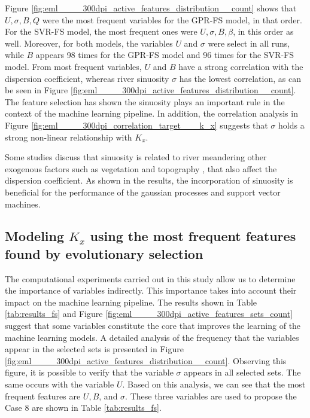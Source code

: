 \documentclass[a4paper,12pt, english]{article}
\begin{document}
Figure \ref{fig:eml____300dpi_active_features_distribution__count} shows that $ U, \sigma, B, Q $ were the most frequent variables for the GPR-FS model, in that order. For the SVR-FS model, the most frequent ones were $ U, \sigma, B, \beta $, in this order as well.
Moreover, for both models, the variables $ U $ and $ \sigma $ were select in all runs, while  $ B $  appears 98 times for the GPR-FS model and 96 times for the SVR-FS model.
From most frequent variables, $ U $ and $ B $ have a strong correlation with the dispersion coefficient, whereas river sinuosity $ \sigma $ has the lowest correlation, as can be seen in Figure \ref{fig:eml____300dpi_active_features_distribution__count}. 
% 
The feature selection has shown the sinuosity plays an important rule in the context of the machine learning pipeline. 
In addition, the correlation analysis in Figure 
\ref{fig:eml____300dpi_correlation_target___k_x}
suggests that $\sigma$ holds a strong non-linear relationship with $K_x$. 


Some studies discuss that sinuosity is related to river meandering \cite{deng2002longitudinal} other  exogenous factors such as vegetation \cite{camporeale:2010, savickis:2016} and topography \cite{timar:2003, dijk2013sinuosity}, that also affect the dispersion coefficient.
As shown in the results, the incorporation of sinuosity is  beneficial for the performance of the gaussian processes and support vector machines.



\subsection{\label{sec:ldc-sfs} Modeling $K_x$ using the most frequent features found by evolutionary selection}

The computational experiments carried out in this study allow us to determine the importance of variables indirectly. This importance takes into account their impact on the machine learning pipeline.
The results shown in Table  \ref{tab:results_fs} and  Figure \ref{fig:eml____300dpi_active_features_sets_count} suggest that some variables constitute the core that improves the learning of the machine learning models.
A detailed analysis of the frequency that the variables appear in the selected sets is presented in Figure \ref{fig:eml____300dpi_active_features_distribution__count}.
Observing this figure, it is possible to verify that the variable $ \sigma $ appears in all selected sets. The same occurs with the variable $ U $. 
% 
Based on this analysis,  we can see that the most frequent features are $U, B$, and $\sigma$. These three variables are used to propose the Case 8 are shown in Table \ref{tab:results_fs}. 
\end{document}
